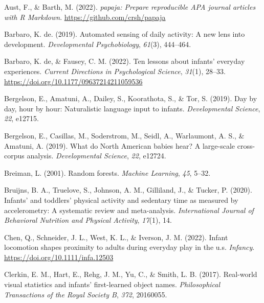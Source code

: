 \documentclass[
  man]{apa6}
\newlength{\cslhangindent}
\newlength{\cslentryspacingunit} %
\newenvironment{CSLReferences}[2] %
 {%
  \setlength{\parindent}{0pt}
  \ifodd #1
  \let\oldpar\par
  \def\par{\hangindent=\cslhangindent\oldpar}
  \fi
  \setlength{\parskip}{#2\cslentryspacingunit}
 }%
 {}
\begin{document}
\begin{CSLReferences}{1}{0}
\leavevmode{}%
Aust, F., \& Barth, M. (2022). \emph{{papaja: Prepare reproducible APA journal articles with R Markdown}}. \url{https://github.com/crsh/papaja}

\leavevmode{}%
Barbaro, K. de. (2019). Automated sensing of daily activity: A new lens into development. \emph{Developmental Psychobiology}, \emph{61}(3), 444--464.

\leavevmode{}%
Barbaro, K. de, \& Fausey, C. M. (2022). Ten lessons about infants' everyday experiences. \emph{Current Directions in Psychological Science}, \emph{31}(1), 28--33. \url{https://doi.org/10.1177/09637214211059536}

\leavevmode{}%
Bergelson, E., Amatuni, A., Dailey, S., Koorathota, S., \& Tor, S. (2019). Day by day, hour by hour: Naturalistic language input to infants. \emph{Developmental Science}, \emph{22}, e12715.

\leavevmode{}%
Bergelson, E., Casillas, M., Soderstrom, M., Seidl, A., Warlaumont, A. S., \& Amatuni, A. (2019). What do {N}orth {A}merican babies hear? {A} large-scale cross-corpus analysis. \emph{Developmental Science}, \emph{22}, e12724.

\leavevmode{}%
Breiman, L. (2001). Random forests. \emph{Machine Learning}, \emph{45}, 5--32.

\leavevmode{}%
Bruijns, B. A., Truelove, S., Johnson, A. M., Gilliland, J., \& Tucker, P. (2020). Infants' and toddlers' physical activity and sedentary time as measured by accelerometry: A systematic review and meta-analysis. \emph{International Journal of Behavioral Nutrition and Physical Activity}, \emph{17}(1), 14.

\leavevmode{}%
Chen, Q., Schneider, J. L., West, K. L., \& Iverson, J. M. (2022). Infant locomotion shapes proximity to adults during everyday play in the u.s. \emph{Infancy}. \url{https://doi.org/10.1111/infa.12503}

\leavevmode{}%
Clerkin, E. M., Hart, E., Rehg, J. M., Yu, C., \& Smith, L. B. (2017). Real-world visual statistics and infants' first-learned object names. \emph{Philosophical Transactions of the Royal Society B}, \emph{372}, 20160055.


\end{CSLReferences}
\end{document}
